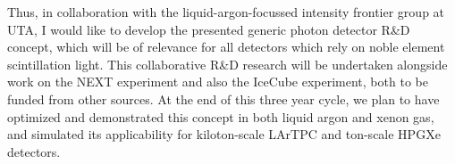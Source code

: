 Thus, in collaboration with the liquid-argon-focussed intensity frontier group at UTA, I would like to develop the presented generic photon detector R\&D concept, which will be of relevance for all detectors which rely on noble element scintillation light.  This collaborative R\&D research will be undertaken alongside work on the NEXT experiment and also the IceCube experiment, both to be funded from other sources.  At the end of this three year cycle, we plan to have optimized and demonstrated this concept in both liquid argon and xenon gas, and simulated its applicability for kiloton-scale LArTPC and ton-scale HPGXe detectors.
